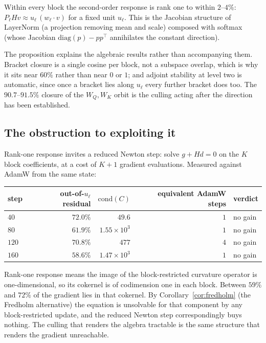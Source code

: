 \begin{proposition}\label{prop:rank-one}
Within every block the second-order response is rank one to within
$2$--$4\%$: $P_\ell H v \approx u_\ell\,(w_\ell\!\cdot\! v)$ for a fixed unit
$u_\ell$. This is the Jacobian structure of LayerNorm (a projection removing
mean and scale) composed with softmax (whose Jacobian $\mathrm{diag}(p)-pp^{\!\top}$
annihilates the constant direction).
\end{proposition}

The proposition explains the algebraic results rather than accompanying them.
Bracket closure is a single cosine per block, not a subspace overlap, which is
why it sits near $60\%$ rather than near $0$ or $1$; and adjoint stability at
level two is automatic, since once a bracket lies along $u_\ell$ every further
bracket does too. The $90.7$--$91.5\%$ closure of the $W_Q,W_K$ orbit is the
culling acting after the direction has been established.

\subsection{The obstruction to exploiting it}

Rank-one response invites a reduced Newton step: solve $g + Hd = 0$ on the
$K$ block coefficients, at a cost of $K{+}1$ gradient evaluations. Measured
against AdamW from the same state:

\begin{center}
\begin{tabular}{lrrrl}
\toprule
step & out-of-$u_\ell$ residual & $\mathrm{cond}(C)$ & equivalent AdamW steps & verdict \\
\midrule
$40$  & $72.0\%$ & $49.6$ & $1$ & no gain \\
$80$  & $61.9\%$ & $1.55{\times}10^{3}$ & $1$ & no gain \\
$120$ & $70.8\%$ & $477$ & $4$ & no gain \\
$160$ & $58.6\%$ & $1.47{\times}10^{3}$ & $1$ & no gain \\
\bottomrule
\end{tabular}
\end{center}

\begin{observation}
Rank-one response means the image of the block-restricted curvature operator
is one-dimensional, so its cokernel is of codimension one in each block.
Between $59\%$ and $72\%$ of the gradient lies in that cokernel. By
Corollary~\ref{cor:fredholm} (the Fredholm alternative) the equation is
unsolvable for that component by any block-restricted update, and the reduced
Newton step correspondingly buys nothing. The culling that renders the algebra
tractable is the same structure that renders the gradient unreachable.
\end{observation}


